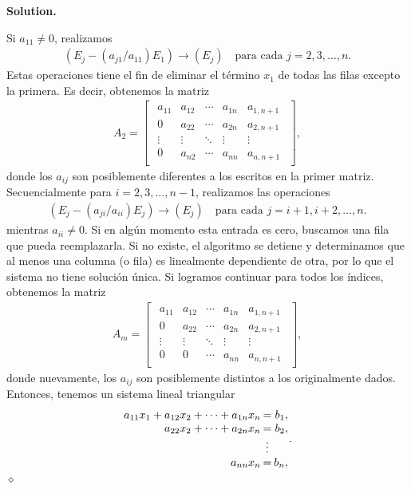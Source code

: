 \documentclass{article}
\theoremstyle{problemstyle}
\newenvironment{solution}{%
  \begin{mdframed}[linewidth=0.8pt,linecolor=Gray,backgroundcolor=Gray!5,roundcorner=5pt]%
  \noindent\textbf{Solution.}%
}{%
\hfill $ \diamond $ 
  \end{mdframed}%
}
\begin{document}
\begin{solution}
	Si $ a_{11} \neq 0 $, realizamos
	\begin{align*}
		(E_j - (a_{j1}/a_{11})E_1) \to (E_j)\quad \text{para cada } j = 2,3,\dots,n.
	\end{align*}
	Estas operaciones tiene el fin de eliminar el t\'ermino $ x_1 $ de todas las filas excepto la primera. Es decir, obtenemos la matriz
	\begin{align*} A_2 =
		\begin{bmatrix}
			\begin{array}{cccc|c}
				a_{11} & a_{12} & \cdots & a_{1n} & a_{1,n+1} \\
				0      & a_{22} & \cdots & a_{2n} & a_{2,n+1} \\
				\vdots & \vdots & \ddots & \vdots & \vdots    \\
				0      & a_{n2} & \cdots & a_{nn} & a_{n,n+1}
			\end{array}
		\end{bmatrix},
	\end{align*}
	donde los $ a_{ij} $ son posiblemente diferentes a los escritos en la primer matriz. Secuencialmente para $ i = 2,3,\dots, n-1 $, realizamos las operaciones
	\begin{align*}
		(E_j - (a_{ji}/a_{ii})E_j) \to (E_j)\quad \text{para cada } j = i+1, i+2,\dots, n.
	\end{align*}
	mientras $ a_{ii}\neq 0 $. Si en alg\'un momento esta entrada es cero, buscamos una fila que pueda reemplazarla. Si no existe, el algoritmo se detiene y determinamos que al menos una columna (o fila) es linealmente dependiente de otra, por lo que el sistema no tiene soluci\'on \'unica. Si logramos continuar para todos los \'indices, obtenemos la matriz
	\begin{align*} A_m =
		\begin{bmatrix}
			\begin{array}{cccc|c}
				a_{11} & a_{12} & \cdots & a_{1n} & a_{1,n+1} \\
				0      & a_{22} & \cdots & a_{2n} & a_{2,n+1} \\
				\vdots & \vdots & \ddots & \vdots & \vdots    \\
				0      & 0      & \cdots & a_{nn} & a_{n,n+1}
			\end{array}
		\end{bmatrix},
	\end{align*}
  donde nuevamente, los $ a_{ij} $ son posiblemente distintos a los originalmente dados. Entonces, tenemos un sistema lineal triangular
	\begin{align*}
    \arraycolsep=1pt
		\begin{array}{rcr}
      a_{11}x_{1} + a_{12}x_{2} + \cdots + a_{1n}x_{n} &= &b_{1}, \\
      a_{22}x_{2} + \cdots + a_{2n}x_{n} &=& b_{2}, \\
                                         &\vdots & \\
              a_{nn}x_{n} &=& b_{n},
		\end{array}.
	\end{align*}
\end{solution}
\end{document}
